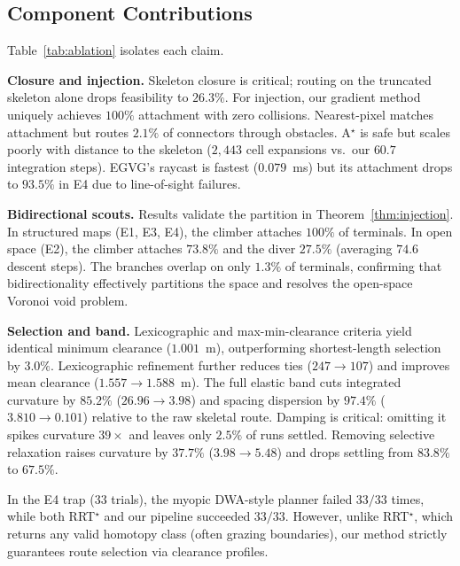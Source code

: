 \documentclass[conference]{IEEEtran}
\begin{document}
\subsection{Component Contributions}

Table~\ref{tab:ablation} isolates each claim.

\textbf{Closure and injection.} Skeleton closure is critical; routing on the truncated skeleton alone drops feasibility to $26.3\%$. For injection, our gradient method uniquely achieves $100\%$ attachment with zero collisions. Nearest-pixel matches attachment but routes $2.1\%$ of connectors through obstacles. A$^\star$ is safe but scales poorly with distance to the skeleton ($2{,}443$ cell expansions vs.\ our $60.7$ integration steps). EGVG's raycast is fastest ($0.079$~ms) but its attachment drops to $93.5\%$ in E4 due to line-of-sight failures.

\textbf{Bidirectional scouts.} Results validate the partition in Theorem~\ref{thm:injection}. In structured maps (E1, E3, E4), the climber attaches $100\%$ of terminals. In open space (E2), the climber attaches $73.8\%$ and the diver $27.5\%$ (averaging $74.6$ descent steps). The branches overlap on only $1.3\%$ of terminals, confirming that bidirectionality effectively partitions the space and resolves the open-space Voronoi void problem.

\textbf{Selection and band.} Lexicographic and max-min-clearance criteria yield identical minimum clearance ($1.001$~m), outperforming shortest-length selection by $3.0\%$. Lexicographic refinement further reduces ties ($247\rightarrow107$) and improves mean clearance ($1.557\rightarrow1.588$~m). The full elastic band cuts integrated curvature by $85.2\%$ ($26.96\rightarrow3.98$) and spacing dispersion by $97.4\%$ ($3.810\rightarrow0.101$) relative to the raw skeletal route. Damping is critical: omitting it spikes curvature $39\times$ and leaves only $2.5\%$ of runs settled. Removing selective relaxation raises curvature by $37.7\%$ ($3.98\rightarrow5.48$) and drops settling from $83.8\%$ to $67.5\%$. 

In the E4 trap ($33$ trials), the myopic DWA-style planner failed $33/33$ times, while both RRT$^\star$ and our pipeline succeeded $33/33$. However, unlike RRT$^\star$, which returns any valid homotopy class (often grazing boundaries), our method strictly guarantees route selection via clearance profiles.

\end{document}
